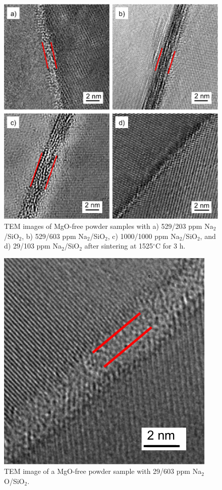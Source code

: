 \newpage
\begin{figure}[H]
	\centering
	\includegraphics[width=\textwidth]{Chapter-4/Figures/Figure8.png}
	\caption{TEM images of MgO-free powder samples with a) 529/203 ppm Na$_{2}$/SiO$_{2}$, b) 529/603 ppm Na$_{2}$/SiO$_{2}$, c) 1000/1000 ppm Na$_{2}$/SiO$_{2}$, and d) 29/103 ppm Na$_{2}$/SiO$_{2}$ after sintering at 1525$^{\circ}$C for 3 h.}
	\label{Ch4-figure:Figure8}
\end{figure}

\newpage
\begin{figure}[H]
	\centering
	\includegraphics{Chapter-4/Figures/Figure9.png}
	\caption{TEM image of a MgO-free powder sample with 29/603 ppm Na$_{2}$O/SiO$_{2}$.}
	\label{Ch4-figure:Figure9}
\end{figure}

